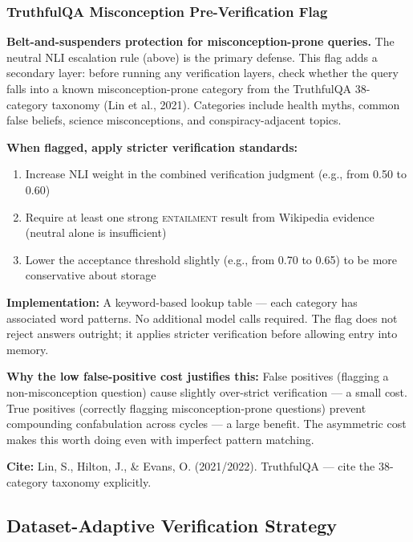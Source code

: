 \documentclass[12pt,a4paper]{article}
\theoremstyle{definition}
\begin{document}
\subsubsection{TruthfulQA Misconception Pre-Verification Flag}

\begin{designbox}
\textbf{Belt-and-suspenders protection for misconception-prone queries.} The neutral NLI escalation rule (above) is the primary defense. This flag adds a secondary layer: before running any verification layers, check whether the query falls into a known misconception-prone category from the TruthfulQA 38-category taxonomy (Lin et al., 2021). Categories include health myths, common false beliefs, science misconceptions, and conspiracy-adjacent topics.

\textbf{When flagged, apply stricter verification standards:}
\begin{enumerate}
    \item Increase NLI weight in the combined verification judgment (e.g., from 0.50 to 0.60)
    \item Require at least one strong \textsc{entailment} result from Wikipedia evidence (neutral alone is insufficient)
    \item Lower the acceptance threshold slightly (e.g., from 0.70 to 0.65) to be more conservative about storage
\end{enumerate}

\textbf{Implementation:} A keyword-based lookup table — each category has associated word patterns. No additional model calls required. The flag does not reject answers outright; it applies stricter verification before allowing entry into memory.

\textbf{Why the low false-positive cost justifies this:} False positives (flagging a non-misconception question) cause slightly over-strict verification — a small cost. True positives (correctly flagging misconception-prone questions) prevent compounding confabulation across cycles — a large benefit. The asymmetric cost makes this worth doing even with imperfect pattern matching.

\textbf{Cite:} Lin, S., Hilton, J., \& Evans, O. (2021/2022). TruthfulQA — cite the 38-category taxonomy explicitly.
\end{designbox}

\subsection{Dataset-Adaptive Verification Strategy}
\end{document}
